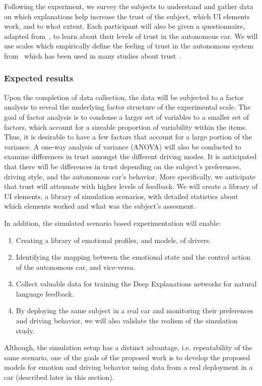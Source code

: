 Following the experiment, we survey the subjects to understand and gather data on which explanations help increase the trust of the subject, which UI elements work, and to what extent.
Each participant will also be given a questionnaire, adapted from~\cite{merritt2013trust}, to learn about their levels of trust in the autonomous car. 
We will use scales which empirically define the feeling of trust in the autonomous system from~\cite{jian2000foundations} which has been used in many studies about trust~\cite{hoff2015trust}.

\subsubsection{Expected results} 
Upon the completion of data collection, the data will be subjected to a factor analysis to reveal the underlying factor structure of the experimental scale. 
The goal of factor analysis is to condense a larger set of variables to a smaller set of factors, which account for a sizeable proportion of variability within the items. Thus, it is desirable to have a few factors that account for a large portion of the variance. 
A one-way analysis of variance (ANOVA) will also be conducted to examine differences in trust amongst the different driving modes. 
It is anticipated that there will be differences in trust depending on the subject's preferences, driving style, and the autonomous car's behavior. 
More specifically, we anticipate that trust will attenuate with higher levels of feedback. We will create a library of UI elements, a library of simulation scenarios, with detailed statistics about which elements worked and what was the subject's assesment.

In addition, the simulated scenario based experimentation will enable:
\begin{enumerate}
    \item Creating a library of emotional profiles, and models, of drivers.
    \item Identifying the mapping between the emotional state and the control action of the autonomous car, and vice-versa.
    \item Collect valuable data for training the Deep Explanations networks for natural language feedback.
    \item By deploying the same subject in a real car and monitoring their preferences and driving behavior, we will also validate the realism of the simulation study. 
\end{enumerate}

Although, the simulation setup has a distinct advantage, i.e. repeatability of the same scenario, one of the goals of the proposed work is to develop the proposed models for emotion and driving behavior using data from a real deployment in a car (described later in this section). 


